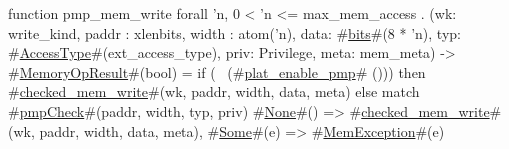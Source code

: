 function pmp_mem_write forall 'n, 0 < 'n <= max_mem_access . (wk: write_kind, paddr : xlenbits, width : atom('n), data: #\hyperref[sailRISCVzbits]{bits}#(8 * 'n), typ: #\hyperref[sailRISCVzAccessType]{AccessType}#(ext_access_type), priv: Privilege, meta: mem_meta) -> #\hyperref[sailRISCVzMemoryOpResult]{MemoryOpResult}#(bool) =
  if   (~ (#\hyperref[sailRISCVzplatzyenablezypmp]{plat\_enable\_pmp}# ()))
  then #\hyperref[sailRISCVzcheckedzymemzywrite]{checked\_mem\_write}#(wk, paddr, width, data, meta)
  else {
    match #\hyperref[sailRISCVzpmpCheck]{pmpCheck}#(paddr, width, typ, priv) {
      #\hyperref[sailRISCVzNone]{None}#()  => #\hyperref[sailRISCVzcheckedzymemzywrite]{checked\_mem\_write}#(wk, paddr, width, data, meta),
      #\hyperref[sailRISCVzSome]{Some}#(e) => #\hyperref[sailRISCVzMemException]{MemException}#(e)
    }
  }
